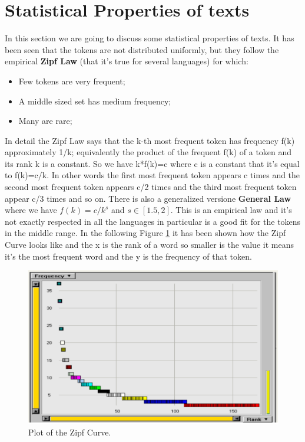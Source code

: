 \section{Statistical Properties of texts}
In this section we are going to discuss some statistical properties of texts. It has been seen that the tokens are not distributed uniformly, but they follow the empirical \textbf{Zipf Law} (that it's true for several languages) for which:
\begin{itemize}
    \item Few tokens are very frequent;
    \item A middle sized set has medium frequency;
    \item Many are rare;
\end{itemize}
In detail the Zipf Law says that the k-th most frequent token has frequency f(k) approximately 1/k; equivalently the product of the frequent f(k) of a token and its rank k is a constant. So we have k*f(k)=c where c is a constant that it's equal to f(k)=c/k. In other words the first most frequent token appears c times and the second most frequent token appears c/2 times and the third most frequent token appear c/3 times and so on.\newline
There is also a generalized versione \textbf{General Law} where we have $f(k)=c/k^s$ and $s \in [1.5,2]$. This is an empirical law and it's not exactly respected in all the languages in particular is a good fit for the tokens in the middle range.
In the following Figure \ref{fig:zipfcurve} it has been shown how the Zipf Curve looks like and the x is the rank of a word so smaller is the value it means it's the most frequent word and the y is the frequency of that token.
\begin{figure}
    \centering
    \includegraphics[width=0.75\linewidth]{images/zipfcurve.png}
    \caption{Plot of the Zipf Curve.}
    \label{fig:zipfcurve}
\end{figure}
